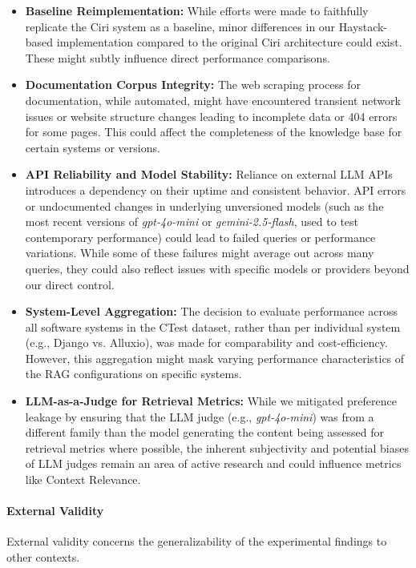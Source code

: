 \begin{itemize}
    \item \textbf{Baseline Reimplementation:} While efforts were made to faithfully replicate the Ciri system as a baseline, minor differences in our Haystack-based implementation compared to the original Ciri architecture could exist. These might subtly influence direct performance comparisons.
    \item \textbf{Documentation Corpus Integrity:} The web scraping process for documentation, while automated, might have encountered transient network issues or website structure changes leading to incomplete data or 404 errors for some pages. This could affect the completeness of the knowledge base for certain systems or versions.
    \item \textbf{API Reliability and Model Stability:} Reliance on external LLM APIs introduces a dependency on their uptime and consistent behavior. API errors or undocumented changes in underlying unversioned models (such as the most recent versions of \textit{gpt-4o-mini} or \textit{gemini-2.5-flash}, used to test contemporary performance) could lead to failed queries or performance variations. While some of these failures might average out across many queries, they could also reflect issues with specific models or providers beyond our direct control.
    \item \textbf{System-Level Aggregation:} The decision to evaluate performance across all software systems in the CTest dataset, rather than per individual system (e.g., Django vs. Alluxio), was made for comparability and cost-efficiency. However, this aggregation might mask varying performance characteristics of the RAG configurations on specific systems.
    \item \textbf{LLM-as-a-Judge for Retrieval Metrics:} While we mitigated preference leakage by ensuring that the LLM judge (e.g., \textit{gpt-4o-mini}) was from a different family than the model generating the content being assessed for retrieval metrics where possible, the inherent subjectivity and potential biases of LLM judges remain an area of active research and could influence metrics like Context Relevance.
\end{itemize}

\paragraph{External Validity}
External validity concerns the generalizability of the experimental findings to other contexts.

